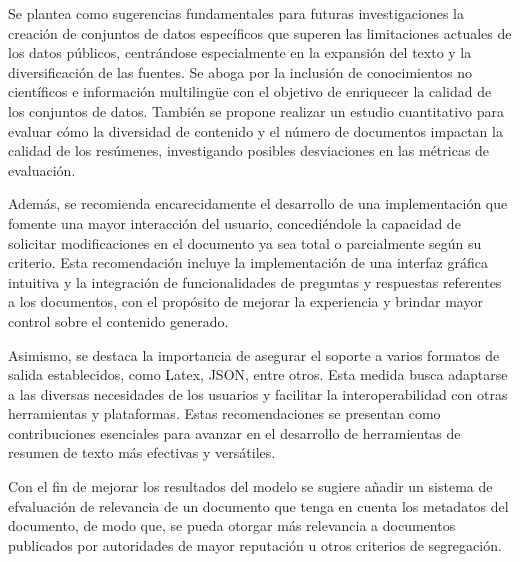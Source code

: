 \begin{recomendations}
    Se plantea como sugerencias fundamentales para futuras investigaciones la creación de conjuntos de datos específicos que superen las limitaciones actuales de los datos públicos, centrándose especialmente en la expansión del texto y la diversificación de las fuentes. Se aboga por la inclusión de conocimientos no científicos e información multilingüe con el objetivo de enriquecer la calidad de los conjuntos de datos. También se propone realizar un estudio cuantitativo para evaluar cómo la diversidad de contenido y el número de documentos impactan la calidad de los resúmenes, investigando posibles desviaciones en las métricas de evaluación.

    Además, se recomienda encarecidamente el desarrollo de una implementación que fomente una mayor interacción del usuario, concediéndole la capacidad de solicitar modificaciones en el documento ya sea total o parcialmente según su criterio. Esta recomendación incluye la implementación de una interfaz gráfica intuitiva y la integración de funcionalidades de preguntas y respuestas referentes a los documentos, con el propósito de mejorar la experiencia y brindar mayor control sobre el contenido generado.
    
    Asimismo, se destaca la importancia de asegurar el soporte a varios formatos de salida establecidos, como Latex, JSON, entre otros. Esta medida busca adaptarse a las diversas necesidades de los usuarios y facilitar la interoperabilidad con otras herramientas y plataformas. Estas recomendaciones se presentan como contribuciones esenciales para avanzar en el desarrollo de herramientas de resumen de texto más efectivas y versátiles.

    Con el fin de mejorar los resultados del modelo se sugiere añadir un sistema de efvaluación de relevancia de un documento que tenga en cuenta los metadatos del documento, de modo que, se pueda otorgar más relevancia a documentos publicados por autoridades de mayor reputación u otros criterios de segregación.
    
\end{recomendations}

